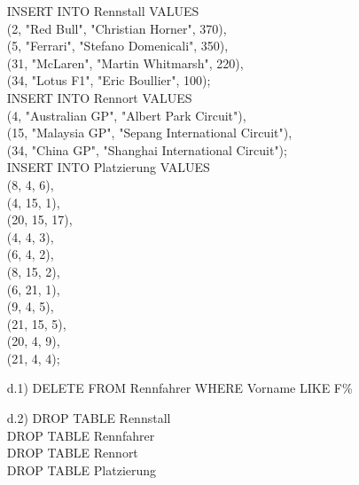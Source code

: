 \documentclass[a4paper,12pt]{scrartcl}
\begin{document}
\begin{enumerate}
			  INSERT INTO Rennstall VALUES\\
			  (2, "Red Bull", "Christian Horner", 370),\\
			  (5, "Ferrari", "Stefano Domenicali", 350),\\
			  (31, "McLaren", "Martin Whitmarsh", 220),\\
			  (34, "Lotus F1", "Eric Boullier", 100);\\
			  
			  INSERT INTO Rennort VALUES\\
			  (4, "Australian GP", "Albert Park Circuit"),\\
			  (15, "Malaysia GP", "Sepang International Circuit"),\\
			  (34, "China GP", "Shanghai International Circuit");\\
			  
			  INSERT INTO Platzierung VALUES\\
			  (8, 4, 6),\\
			  (4, 15, 1),\\
			  (20, 15, 17),\\
			  (4, 4, 3),\\
			  (6, 4, 2),\\
			  (8, 15, 2),\\
			  (6, 21, 1),\\
			  (9, 4, 5),\\
			  (21, 15, 5),\\
			  (20, 4, 9),\\
			  (21, 4, 4);\\
			     
	\item[d.1)] DELETE FROM Rennfahrer WHERE Vorname LIKE F\%
	\item[d.2)] DROP TABLE Rennstall\\
				DROP TABLE Rennfahrer\\
	            DROP TABLE Rennort\\
		        DROP TABLE Platzierung
	

\end{enumerate} 	
	
\end{document}
